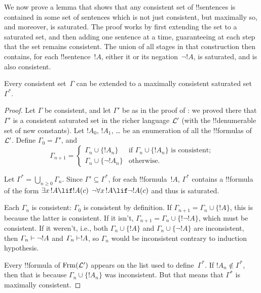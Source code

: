 \documentclass[../../../include/open-logic-section]{subfiles}
\begin{document}

We now prove a lemma that shows that any consistent set of
!!{sentence}s is contained in some set of sentences which is not just
consistent, but maximally so, and moreover, is saturated. The proof
works by first extending the set to a saturated set, and then adding
one sentence at a time, guaranteeing at each step
that the set remains consistent. The union of all stages in that
construction then contains, for each !!{sentence}~$!A$, either it or
its negation~$\lnot !A$, is saturated, and is also consistent.

\begin{lem}
Every consistent set~$\Gamma$ can be extended to a maximally
consistent saturated set~$\Gamma^*$.
\end{lem}

\begin{proof}
Let $\Gamma$ be consistent, and let $\Gamma'$ be as in the proof of
: we proved there that $\Gamma'$
is a consistent saturated set in the richer language $\mathcal L'$ (with
the !!{denumerable} set of new constants).  Let $!A_0$, $!A_1$, \dots{}
be an enumeration of all the !!{formula}s of~$\mathcal L'$.  Define
$\Gamma_0 = \Gamma'$, and
\[
\Gamma_{n+1} =
\begin{cases}
\Gamma_n \cup \{ !A_n \} & \textrm{if $\Gamma_n \cup \{!A_n\}$ is
  consistent;} \\
\Gamma_n \cup \{ \lnot !A_n \} & \textrm{otherwise.}
\end{cases}
\]

Let $\Gamma^* = \bigcup_{n \geq 0} \Gamma_n$. Since $\Gamma' \subseteq
\Gamma^*$, for each !!{formula}~$!A$, $\Gamma^*$ contains a
!!{formula} of the form
{$\lexists[x][!A] \lif !A(c)$}
{$\lnot\lforall[x][!A] \lif \lnot !A(c)$}
and thus is saturated.

Each $\Gamma_n$ is consistent: $\Gamma_0$ is consistent by
definition.  If $\Gamma_{n+1} = \Gamma_n \cup \{!A\}$, this is because
the latter is consistent.  If it isn't, $\Gamma_{n+1} = \Gamma_n \cup
\{!\lnot !A\}$, which must be consistent.  If it weren't, i.e., both
$\Gamma_n \cup \{!A\}$ and $\Gamma_n \cup \{\lnot !A\}$ are
inconsistent, then $\Gamma_n \Proves \lnot !A$ and $\Gamma_n \Proves
!A$, so $\Gamma_n$ would be inconsistent contrary to induction
hypothesis.

Every !!{formula} of $\Frm[L']$ appears on the list used to
define~$\Gamma^*$.  If $!A_n \notin \Gamma^*$, then that is because
$\Gamma_n \cup \{!A_n\}$ was inconsistent.  But that means that
$\Gamma^*$ is maximally consistent.
\end{proof}
\end{document}
